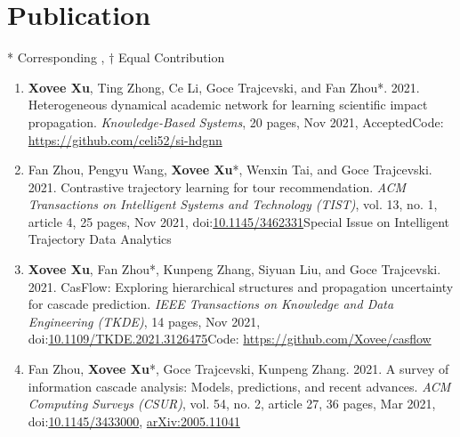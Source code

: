 \section*{Publication}
\indent

* Corresponding
, $\dagger$ Equal Contribution


\begin{enumerate}[resume]
    \item \textbf{Xovee Xu}, Ting Zhong, Ce Li, Goce Trajcevski, and Fan Zhou*. 2021. Heterogeneous dynamical academic network for learning scientific impact propagation. \textit{Knowledge-Based Systems}, 20 pages, Nov 2021, Accepted\newline Code: \url{https://github.com/celi52/si-hdgnn}
    \item Fan Zhou, Pengyu Wang, \textbf{Xovee Xu}*, Wenxin Tai, and Goce Trajcevski. 2021. Contrastive trajectory learning for tour recommendation. \textit{ACM Transactions on Intelligent Systems and Technology (TIST)}, vol. 13, no. 1, article 4, 25 pages, Nov 2021, doi:\href{https://doi.org/10.1145/3462331}{10.1145/3462331}\newline Special Issue on Intelligent Trajectory Data Analytics
    \item \textbf{Xovee Xu}, Fan Zhou*, Kunpeng Zhang, Siyuan Liu, and Goce Trajcevski. 2021. CasFlow: Exploring hierarchical structures and propagation uncertainty for cascade prediction. \textit{IEEE Transactions on Knowledge and Data Engineering (TKDE)}, 14 pages, Nov 2021, doi:\href{https://doi.org/10.1109/TKDE.2021.3126475}{10.1109/TKDE.2021.3126475}\newline Code: \url{https://github.com/Xovee/casflow}
    \item Fan Zhou, \textbf{Xovee Xu}*, Goce Trajcevski, Kunpeng Zhang. 2021. A survey of information cascade analysis: Models, predictions, and recent advances. \textit{ACM Computing Surveys (CSUR)}, vol. 54, no. 2, article 27, 36 pages, Mar 2021, doi:\href{https://xovee.cn/html/paper-redirects/csur2021.html}{10.1145/3433000}, \href{https://arxiv.org/abs/2005.11041}{arXiv:2005.11041}
\end{enumerate}


